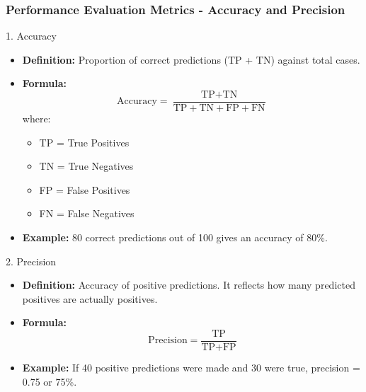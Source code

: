 \documentclass[aspectratio=169]{beamer}
\begin{document}
\begin{frame}[fragile]
    \frametitle{Performance Evaluation Metrics - Accuracy and Precision}
    \begin{block}{1. Accuracy}
        \begin{itemize}
            \item \textbf{Definition:} Proportion of correct predictions (TP + TN) against total cases.
            \item \textbf{Formula:}
            \begin{equation}
            \text{Accuracy} = \frac{\text{TP} + \text{TN}}{\text{TP} + \text{TN} + \text{FP} + \text{FN}}
            \end{equation}
            where:
            \begin{itemize}
                \item TP = True Positives
                \item TN = True Negatives
                \item FP = False Positives
                \item FN = False Negatives
            \end{itemize}
            \item \textbf{Example:} 80 correct predictions out of 100 gives an accuracy of 80\%.
        \end{itemize}
    \end{block}
    
    \begin{block}{2. Precision}
        \begin{itemize}
            \item \textbf{Definition:} Accuracy of positive predictions. It reflects how many predicted positives are actually positives.
            \item \textbf{Formula:}
            \begin{equation}
            \text{Precision} = \frac{\text{TP}}{\text{TP} + \text{FP}}
            \end{equation}
            \item \textbf{Example:} If 40 positive predictions were made and 30 were true, precision = 0.75 or 75\%.
        \end{itemize}
    \end{block}
\end{frame}
\end{document}
